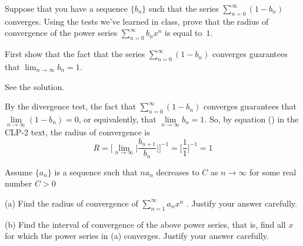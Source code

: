\begin{Mquestion}[2015A]
 Suppose that you have a sequence $\{b_n\}$ such that the series $\sum_{n=0}^{\infty}(1-b_n)$ converges. Using the tests we've learned in class, prove that the radius of convergence of the power series $\displaystyle\sum_{n=0}^{\infty}b_nx^n$ is equal to~$1$.
\end{Mquestion}

\begin{hint}
First show that the fact that the series $\sum_{n=0}^{\infty}(1-b_n)$ converges
 guarantees that $\lim_{n\rightarrow\infty}b_n=1$.
\end{hint}

\begin{answer}
See the solution.
\end{answer}

\begin{solution}
By the divergence test, the fact that $\sum\limits_{n=0}^{\infty}(1-b_n)$
converges guarantees that $\lim\limits_{n\rightarrow\infty}(1-b_n)=0$,
or equivalently, that $\lim\limits_{n\rightarrow\infty}b_n=1$.  So, by
equation  ()  in the
CLP-2 text, the radius of convergence is
\begin{equation}\label{eq:SRradConv}
R =\bigg[\lim_{n\rightarrow\infty}\Big|\frac{b_{n+1}}{b_n}\Big|\bigg]^{-1}
   =\bigg[\frac{1}{1}\bigg]^{-1}
  =1
\end{equation}


\end{solution}

\begin{question}[M121 2014A]
Assume $\big\{a_n \big\}$ is a sequence such that $na_n$ decreases to $C$ as
$n \rightarrow\infty$ for some real number $C > 0$


\noindent (a) Find the radius of convergence of $\displaystyle\sum\limits_{n=1}^\infty
 a_n x^n$ . Justify your answer carefully.

\noindent (b)  Find the interval of convergence of the above power series, that is,
find all $x$ for which the power series in (a) converges. Justify your answer carefully.
\end{question}

